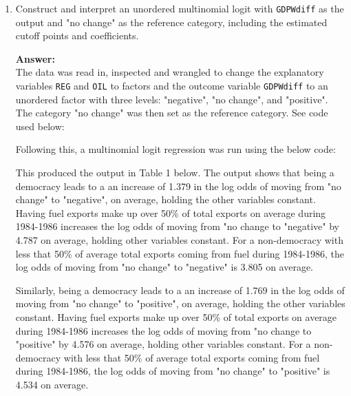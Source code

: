 \documentclass[12pt,letterpaper]{article}
\begin{document}
\begin{enumerate}
	\item Construct and interpret an unordered multinomial logit with \texttt{GDPWdiff} as the output and "no change" as the reference category, including the estimated cutoff points and coefficients.
	
	\vspace{.5cm}
	\textbf{Answer:}\\
	
	The data was read in, inspected and wrangled to change the explanatory variables \texttt{REG} and \texttt{OIL} to factors and the outcome variable \texttt{GDPWdiff} to an unordered factor with three levels: "negative", "no change", and "positive". The category "no change" was then set as the reference category. See code used below:
	
	\vspace{.5cm}
	  
	\vspace{.5cm} 
	
	Following this, a multinomial logit regression was run using the below code:
	
	\vspace{.5cm}
	  
	\vspace{.5cm} 
	
	This produced the output in Table 1 below. The output shows that being a democracy leads to a an increase of 1.379 in the log odds of moving from "no change" to "negative", on average, holding the other variables constant. Having fuel exports make up over 50\% of total exports on average during 1984-1986 increases the log odds of moving from "no change to "negative" by 4.787 on average, holding other variables constant. For a non-democracy with less that 50\% of average total exports coming from fuel during 1984-1986, the log odds of moving from "no change" to "negative" is 3.805 on average.
	
	Similarly, being a democracy leads to a an increase of 1.769 in the log odds of moving from "no change" to "positive", on average, holding the other variables constant. Having fuel exports make up over 50\% of total exports on average during 1984-1986 increases the log odds of moving from "no change to "positive" by 4.576 on average, holding other variables constant. For a non-democracy with less that 50\% of average total exports coming from fuel during 1984-1986, the log odds of moving from "no change" to "positive" is 4.534 on average.
	

\end{enumerate}
\end{document}

